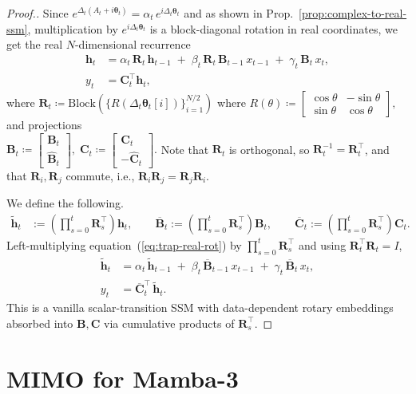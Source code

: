 \documentclass{article}
\def\eqref#1{equation~(\ref{#1})}
\def\vh{{\bm{h}}}
\def\bB{{\bm{B}}}
\def\bC{{\bm{C}}}
\def\bR{{\bm{R}}}
\theoremstyle{plain}
\theoremstyle{definition}
\theoremstyle{remark}
\begin{document}
\begin{proof}[Proof.]
\medskip
Since $e^{\Delta_t(A_t+i\boldsymbol{\theta}_t)}=\alpha_t\,e^{i\Delta_t\boldsymbol{\theta}_t}$ and as shown in Prop.~\ref{prop:complex-to-real-ssm}, multiplication by $e^{i\Delta_t\boldsymbol{\theta}_t}$ is a block-diagonal rotation in real coordinates, we get the real $N$-dimensional recurrence
\begin{align}
\label{eq:trap-real-rot}
\vh_t
&= \alpha_t\,\bR_t\,\vh_{t-1}
  \;+\; \beta_t\,\bR_t\,\bB_{t-1}\,x_{t-1}
  \;+\; \gamma_t\,\bB_t\,x_t,\\[0.25em]
y_t
&= \bC_t^\top \vh_t,\nonumber
\end{align}
where $\bR_t\coloneqq\mathrm{Block}\left(\{R(\Delta_t\boldsymbol{\theta}_t[i])\}_{i=1}^{N/2}\right)$ where
\(
R(\theta)\coloneqq\begin{bmatrix}\cos\theta&-\sin\theta\\ \sin\theta&\cos\theta\end{bmatrix},
\)
and projections \\
\(
\bB_t\coloneqq\begin{bmatrix}\bB_t\\ \hat{\bB}_t\end{bmatrix},\;
\bC_t\coloneqq\begin{bmatrix}\bC_t\\ -\hat{\bC}_t\end{bmatrix}.
\)
Note that $\bR_t$ is orthogonal, so $\bR_t^{-1}=\bR_t^\top$, and that $\bR_i, \bR_j$ commute, i.e., $\bR_i\bR_j=\bR_j\bR_i$.

\medskip
We define the following.
\begin{align*}
\tilde{\vh}_t
&:= \left(\prod_{s=0}^{t}\bR_s^\top\right)\vh_t,\qquad
\overline{\bB}_{t} := \left(\prod_{s=0}^{t}\bR_s^\top\right)\bB_{t},\qquad
\overline{\bC}_{t} := \left(\prod_{s=0}^{t}\bR_s^\top\right)\bC_{t}.
\end{align*}
Left-multiplying \eqref{eq:trap-real-rot} by $\prod_{s=0}^{t}\bR_s^\top$ and using $\bR_t^\top\bR_t=I$,
\begin{align*}
\tilde{\vh}_t
&= \alpha_t\,\tilde{\vh}_{t-1}
  \;+\; \beta_t\,\overline{\bB}_{t-1}\,x_{t-1}
  \;+\; \gamma_t\,\overline{\bB}_{t}\,x_t,\\
y_t
&= \overline{\bC}_t^\top\,\tilde{\vh}_t.
\end{align*}
This is a vanilla scalar-transition SSM with data-dependent rotary embeddings absorbed into $\bB,\bC$ via cumulative products of $\bR_s^\top$.
\end{proof}

\section{MIMO for Mamba-3}
\label{app:mimo-for-mamba}
\end{document}
